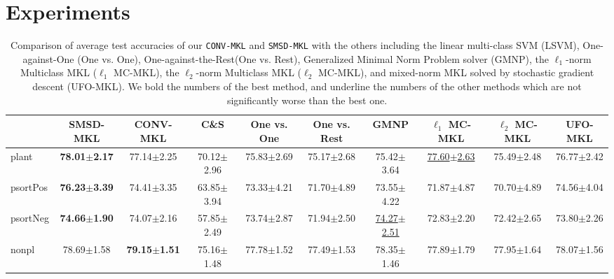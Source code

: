 \documentclass{article}
\begin{document}
\section{Experiments}

\begin{table*}[t]
\small
\footnotesize
   \caption{
    \small Comparison of average test accuracies of our \texttt{CONV-MKL} and \texttt{SMSD-MKL} with the others including
    the linear multi-class SVM (LSVM),
    One-against-One (One vs. One),
    One-against-the-Rest(One vs. Rest),
    Generalized Minimal Norm Problem solver (GMNP),
    the $\ell_1$-norm Multiclass MKL ($\ell_1$ MC-MKL),
    the $\ell_2$-norm Multiclass MKL ($\ell_2$ MC-MKL),
    and mixed-norm MKL solved by stochastic gradient descent (UFO-MKL).
    We bold the numbers of the best method, and underline the numbers of the other methods
    which are not significantly worse than the best one.
   }
   \label{tabel:accuracy}
    \begin{tabular*}{\linewidth}{@{\extracolsep{-0.25cm}}lccccccccc}
    \toprule
                   & SMSD-MKL              & CONV-MKL               & C\&S               & One vs. One              & One vs. Rest                                              & GMNP                      & $\ell_1$ MC-MKL          & $\ell_2$ MC-MKL    & UFO-MKL                  \\ \hline
plant              & \textbf{78.01$\pm$2.17}   &77.14$\pm$2.25            & 70.12$\pm$2.96     & 75.83$\pm$2.69           &75.17$\pm$2.68       &75.42$\pm$3.64    & \underline{77.60$\pm$2.63}&75.49$\pm$2.48            &76.77$\pm$2.42\\
psortPos           & \textbf{76.23$\pm$3.39}   &74.41$\pm$3.35            &63.85$\pm$3.94      &73.33$\pm$4.21            &71.70$\pm$4.89       & 73.55$\pm$4.22   &71.87$\pm$4.87             &70.70$\pm$4.89            &74.56$\pm$4.04\\
psortNeg           & \textbf{74.66$\pm$1.90}   &74.07$\pm$2.16            &57.85$\pm$2.49      &73.74$\pm$2.87            &71.94$\pm$2.50   &\underline{74.27$\pm$2.51}   &72.83$\pm$2.20                             &72.42$\pm$2.65      &73.80$\pm$2.26 \\
nonpl              &78.69$\pm$1.58             & \textbf{79.15$\pm$1.51}  &75.16$\pm$1.48      &77.78$\pm$1.52            &77.49$\pm$1.53 &78.35$\pm$1.46    &77.89$\pm$1.79             &77.95$\pm$1.64            &78.07$\pm$1.56\\

\end{tabular*}
\end{table*}
\end{document}
